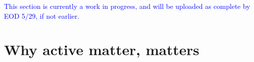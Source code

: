 \textcolor{blue}{This section is currently a work in progress, and will be uploaded as complete by EOD 5/29, if not earlier.}

\section{Why active matter, matters}


%

